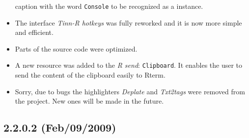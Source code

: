 \begin{itemize}
    caption with the word \texttt{Console} to be recognized as a \RR{}
    instance.
  \item The interface \textit{Tinn-R hotkeys} was fully reworked and it is now
    more simple and efficient.
  \item Parts of the source code were optimized.
  \item A new resource was added to the \textit{R send}: \texttt{Clipboard}.
    It enables the user to send the content of the clipboard easily to Rterm.
  \item Sorry, due to bugs the highlighters \textit{Deplate} and \textit{Txt2tags}
    were removed from the project. New ones will be made in the future.
\end{itemize}


\subsection{2.2.0.2 (Feb/09/2009)}

